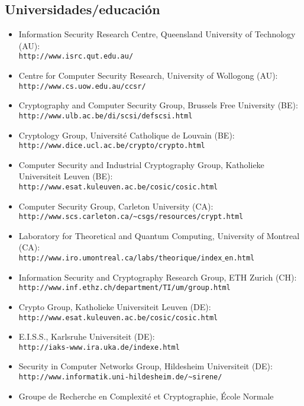 \subsection{Universidades/educaci\'on}
\begin{itemize}
\item Information Security Research Centre, Queensland University of Technology (AU):\\
{\tt http://www.isrc.qut.edu.au/}
\item Centre for Computer Security Research, University of Wollogong (AU):\\
{\tt http://www.cs.uow.edu.au/ccsr/}
\item Cryptography and Computer Security Group, Brussels Free University (BE):\\
{\tt http://www.ulb.ac.be/di/scsi/defscsi.html}
\item Cryptology Group, Universit\'e Catholique de Louvain (BE):\\
{\tt http://www.dice.ucl.ac.be/crypto/crypto.html}
\item Computer Security and Industrial Cryptography Group, Katholieke Universiteit Leuven (BE):\\
{\tt http://www.esat.kuleuven.ac.be/cosic/cosic.html}
\item Computer Security Group, Carleton University (CA):\\
{\tt http://www.scs.carleton.ca/\~{}csgs/resources/crypt.html}
\item Laboratory for Theoretical and Quantum Computing, University of Montreal (CA):\\
{\tt http://www.iro.umontreal.ca/labs/theorique/index$\_$en.html}
\item Information Security and Cryptography Research Group, ETH Zurich (CH):\\
{\tt http://www.inf.ethz.ch/department/TI/um/group.html}
\item Crypto Group, Katholieke Universiteit Leuven (DE):\\
{\tt http://www.esat.kuleuven.ac.be/cosic/cosic.html}
\item E.I.S.S., Karlsruhe Universiteit (DE):\\
{\tt http://iaks-www.ira.uka.de/indexe.html}
\item Security in Computer Networks Group, Hildesheim Universiteit (DE):\\
{\tt http://www.informatik.uni-hildesheim.de/\~{}sirene/}
\item Groupe de Recherche en Complexit\'e et Cryptographie, \'Ecole Normale 

\end{itemize}
